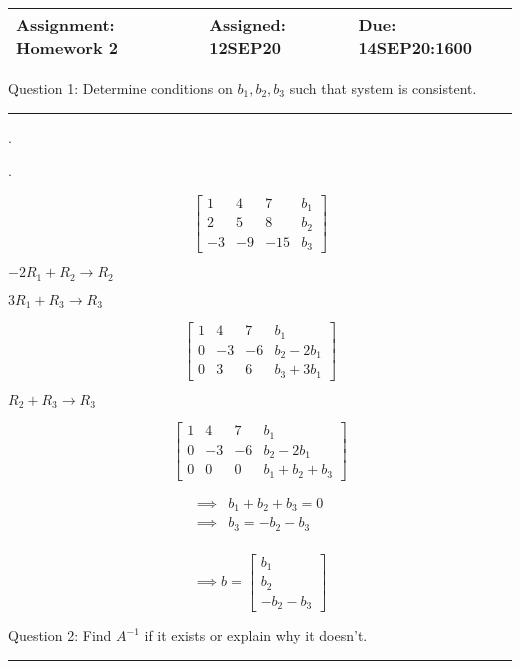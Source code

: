\documentclass[a4paper,11pt,twoside]{report}
\begin{document}
 
\begin{table}[htpb]
	\centering
	\large
	\begin{tabular}{| p{6.6cm} | p{3.9cm} | p{4cm} |}
		\hline
	Assignment: Homework 2 &	Assigned: 12SEP20   & Due: 14SEP20:1600 \\
	\hline
	\end{tabular}
\end{table}
\small
\noindent Question 1: Determine conditions on $b_1,b_2,b_3$ such that system is consistent. \\ \hrule

.

.

\[
\begin{bmatrix} 1 & 4 & 7 & b_1 \\2 & 5 & 8 & b_2 \\ -3 & -9 & -15 & b_3 \end{bmatrix}
\]

$-2R_1 + R_2 \to R_2$

$3R_1 + R_3 \to R_3$

\[\begin{bmatrix} 1 & 4 & 7 & b_1 \\ 0 & -3 & -6 & b_2 -2b_1 \\ 0 & 3 & 6 & b_3 + 3b_1 \end{bmatrix}\]

$R_2 + R_3 \to R_3$

\[\begin{bmatrix} 1 & 4 & 7 & b_1 \\ 0 & -3 & -6 & b_2 -2b_1 \\ 0 & 0 & 0 & b_1 + b_2 + b_3   \end{bmatrix}\]


\begin{align*}
\implies& b_1 + b_2 + b_3 = 0 \\
\implies& b_3 = -b_2 - b_3 \\
\end{align*}

\[\implies b=\boxed{\begin{bmatrix} b_1 \\ b_2 \\ -b_2 -b_3 \end{bmatrix} }\]


\noindent Question 2: Find $A^{-1}$ if it exists or explain why it doesn't. \\ \hrule
\end{document}
